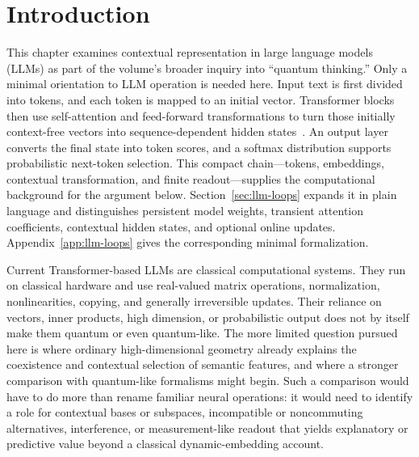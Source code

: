 \documentclass[
  aps,
  reprint,
  superscriptaddress,
  floatfix,
  nofootinbib,
  longbibliography
]{revtex4-2}
\begin{document}
\maketitle


\section{Introduction}
\label{sec:intro}

This chapter examines contextual representation in large language models
(LLMs) as part of the volume's broader inquiry into ``quantum thinking.''
Only a minimal orientation to LLM operation is needed here.  Input text is
first divided into tokens, and each token is mapped to an initial vector.
Transformer blocks then use self-attention and feed-forward transformations
to turn those initially context-free vectors into sequence-dependent hidden
states~\cite{Vaswani-2017-Attention}.  An output layer converts the final state into token scores, and a
softmax distribution supports probabilistic next-token selection.  This
compact chain---tokens, embeddings, contextual transformation, and finite
readout---supplies the computational background for the argument below.
Section~\ref{sec:llm-loops} expands it in plain language and distinguishes
persistent model weights, transient attention coefficients, contextual hidden
states, and optional online updates.  Appendix~\ref{app:llm-loops} gives the
corresponding minimal formalization.

Current Transformer-based LLMs are classical computational systems.  They
run on classical hardware and use real-valued matrix operations,
normalization, nonlinearities, copying, and generally irreversible updates.
Their reliance on vectors, inner products, high dimension, or probabilistic
output does not by itself make them quantum or even quantum-like.  The more
limited question pursued here is where ordinary high-dimensional geometry
already explains the coexistence and contextual selection of semantic
features, and where a stronger comparison with quantum-like formalisms might
begin.  Such a comparison would have to do more than rename familiar neural
operations: it would need to identify a role for contextual bases or subspaces,
incompatible or noncommuting alternatives, interference, or
measurement-like readout that yields explanatory or predictive value beyond
a classical dynamic-embedding account.
\end{document}
